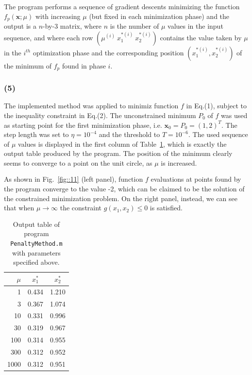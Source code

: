 \documentclass[12pt,titlepage]{article}
\begin{document}
The program performs a sequence of gradient descents minimizing the function $f_p(\bm{x} ; \mu)$ with increasing $\mu$ (but fixed in each minimization phase) and the output is a $n$-by-3 matrix, where $n$ is the number of $\mu$ values in the input sequence, and where each row $( \mu^{(i)} \ x_1^{*(i)} \ x_2^{*(i)} )$ contains the value taken by $\mu$ in the $i^{th}$ optimization phase and the corresponding position $(x_1^{*(i)}, x_2^{*(i)})$ of the minimum of $f_p$ found in phase $i$.

\subsubsection*{(5)}
The implemented method was applied to minimiz function $f$ in Eq.(1), subject to the inequality constraint in Eq.(2). The unconstrained minimum $P_0$ of $f$ was used as starting point for the first minimization phase, i.e. $\bm{x}_0 = P_0 = (1,2)^T$. The step length was set to $\eta = 10^{-4}$ and the threshold to $T = 10^{-6}$. The used sequence of $\mu$ values is displayed in the first column of Table~\ref{tab::outputTable}, which is exactly the output table produced by the program. The position of the minimum clearly seems to converge to a point on the unit circle, as $\mu$ is increased. 

As shown in Fig.~\ref{fig::11} (left panel), function $f$ evaluations at points found by the program converge to the value -2, which can be claimed to be the solution of the constrained minimization problem. On the right panel, instead, we can see that when $\mu \rightarrow \infty$ the constraint $g(x_1, x_2) \leq 0$ is satisfied.

\begin{table}[H]
\centering
\begin{tabular}{rcc}
\toprule
$\mu$ & $x_1^*$ & $x_2^*$ \\
\midrule
1  &  0.434  &  1.210\\
3   & 0.367 &   1.074\\
10 &   0.331 &   0.996\\
30  &  0.319  &  0.967\\
100 &   0.314 &   0.955\\
300  &  0.312  &  0.952\\
1000  &  0.312  &  0.951\\
\bottomrule
\end{tabular}
\caption{Output table of program \texttt{PenaltyMethod.m} with parameters specified above.}
\label{tab::outputTable}
\end{table}
\end{document}
